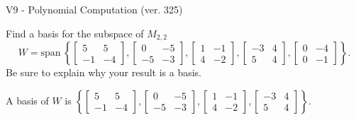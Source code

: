 \begin{exercise}
  \begin{exerciseTitle}V9 - Polynomial Computation (ver. 325)\end{exerciseTitle}
  \begin{exerciseStatement}
    Find a basis for the subspace of \(M_{2,2}\) 
\[W=\mathrm{span}\ \left\{\left[\begin{array}{cc}
5 & 5 \\
-1 & -4
\end{array}\right] , \left[\begin{array}{cc}
0 & -5 \\
-5 & -3
\end{array}\right] , \left[\begin{array}{cc}
1 & -1 \\
4 & -2
\end{array}\right] , \left[\begin{array}{cc}
-3 & 4 \\
5 & 4
\end{array}\right] , \left[\begin{array}{cc}
0 & -4 \\
0 & -1
\end{array}\right]\right\}.\]
 Be sure to explain why your result is a basis.


  \end{exerciseStatement}
  \begin{exerciseAnswer}
   A basis of \(W\) is  \(\left\{\left[\begin{array}{cc}
5 & 5 \\
-1 & -4
\end{array}\right] , \left[\begin{array}{cc}
0 & -5 \\
-5 & -3
\end{array}\right] , \left[\begin{array}{cc}
1 & -1 \\
4 & -2
\end{array}\right] , \left[\begin{array}{cc}
-3 & 4 \\
5 & 4
\end{array}\right]\right\}\).
  


  \end{exerciseAnswer}
\end{exercise}